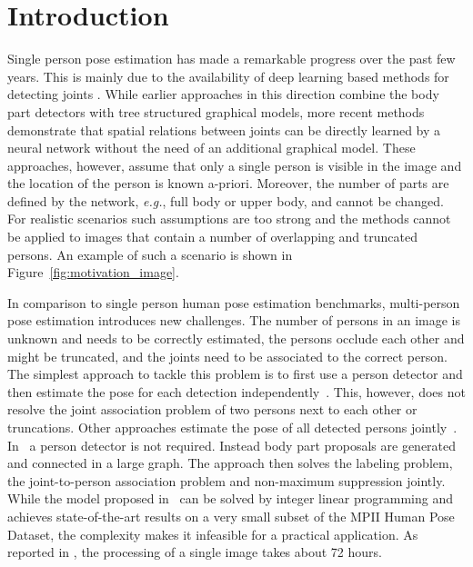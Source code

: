 \documentclass[runningheads]{llncs}
\newcommand{\eg}{\mbox{\emph{e.g.}}}
\begin{document}
\section{Introduction}
Single person pose estimation has made a remarkable progress over the past few years. This is mainly due to the availability of deep learning based methods for detecting joints \cite{carreira2015human, pishchulin2015deepcut, wei2016convolutional, tompson_cvpr2015, insafutdinov2016deepercut}. While earlier approaches in this direction \cite{chen_nips2014, tompson2014joint, tompson_cvpr2015} combine the body part detectors with tree structured graphical models, more recent methods \cite{carreira2015human, pishchulin2015deepcut, wei2016convolutional,newell2016eccv, bulat2016human, rafi2016bmvc} demonstrate that spatial relations between joints can be directly learned by a neural network without the need of an additional graphical model. These approaches, however, assume that only a single person is visible in the image and the location of the person is known a-priori. Moreover, the number of parts are defined by the network, \eg, full body or upper body, and cannot be changed. For realistic scenarios such assumptions are too strong and the methods cannot be applied to images that contain a number of overlapping and truncated persons. An example of such a scenario is shown in Figure~\ref{fig:motivation_image}. 

In comparison to single person human pose estimation benchmarks, multi-person pose estimation introduces new challenges. The number of persons in an image is unknown and needs to be correctly estimated, the persons occlude each other and might be truncated, and the joints need to be associated to the correct person. The simplest approach to tackle this problem is to first use a person detector and then estimate the pose for each detection independently~\cite{pishchulin2012articulated, gkioxari2014using, chen2015parsing}. This, however, does not resolve the joint association problem of two persons next to each other or truncations. Other approaches estimate the pose of all detected persons jointly~\cite{eichner2010we, Ladicky_2013_CVPR}. In~\cite{pishchulin2015deepcut} a person detector is not required. Instead body part proposals are generated and connected in a large graph. The approach then solves the labeling problem, the joint-to-person association problem and non-maximum suppression jointly. While the model proposed in~\cite{pishchulin2015deepcut} can be solved by integer linear programming and achieves state-of-the-art results on a very small subset of the MPII Human Pose Dataset, the complexity makes it infeasible for a practical application. As reported in \cite{insafutdinov2016deepercut}, the processing of a single image takes about 72 hours. 
\end{document}
